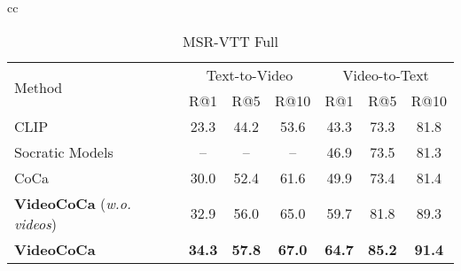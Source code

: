 \begin{table*}[t]
\caption{Comparison to state-of-the-art results on zero-shot text-video retrieval. All results are reported on R@1 / R@5 / R@10. ``\textit{w.o. videos}" refers to the VideoCoCa model that is initialized from the pretrained CoCa model without continued pretraining. For Youcook2 results, see Table \ref{tab:mix_ablations} for the analysis.}
	\vspace{-1.2\baselineskip}
	\begin{tabular}{cc}
	\begin{subtable}[t]{0.49\linewidth}
		\centering
		\caption{MSR-VTT Full}
    	\setlength{\tabcolsep}{2pt} \renewcommand*{\arraystretch}{1.10}  \vspace{-0.3\baselineskip}
		\scriptsize{
	
			\begin{tabular}{l|ccc|ccc}
				\toprule 
 \multirow{2}{*}{Method} & \multicolumn{3}{c|}{Text-to-Video} & \multicolumn{3}{c}{Video-to-Text} \\
 & \multirow{1}{*}{\footnotesize{R@1}} & \multirow{1}{*}{\footnotesize{R@5}} 
 & \multirow{1}{*}{\footnotesize{R@10}} & \multirow{1}{*}{\footnotesize{R@1}} 
 & \multirow{1}{*}{\footnotesize{R@5}}  & \multirow{1}{*}{\footnotesize{R@10}}  
 \\
 \midrule
CLIP~\cite{portilloquintero2021straightforward} & 23.3 & 44.2 & 53.6 & 43.3 & 73.3 & 81.8  \\ 
Socratic Models~\cite{zeng2022socratic} & -- & -- & -- & 46.9 & 73.5 & 81.3  \\ 
CoCa~\cite{yu2022coca} & 30.0 & 52.4 & 61.6 & 49.9 & 73.4 & 81.4  \\ \midrule
\textbf{VideoCoCa} (\textit{w.o. videos}) & 32.9 & 56.0 & 65.0 & 59.7 & 81.8 & 89.3  \\ 
\textbf{VideoCoCa} & \textbf{34.3} & \textbf{57.8} & \textbf{67.0} & \textbf{64.7} & \textbf{85.2} & \textbf{91.4}  \\ 
 \bottomrule
\end{tabular} \label{tab:sota_msrvtt_retrieval}
}
	\end{subtable}
	



\end{tabular}
\end{table*}

